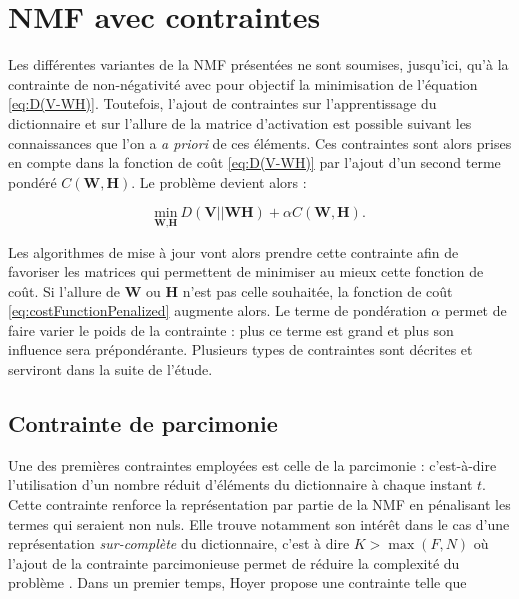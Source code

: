 \section{NMF avec contraintes}\label{part:NMF_contrainte}
Les différentes variantes de la NMF présentées ne sont soumises, jusqu'ici, qu'à la contrainte de non-négativité avec pour objectif la minimisation de l'équation \ref{eq:D(V-WH)}. Toutefois, l'ajout de contraintes sur l'apprentissage du dictionnaire et sur l'allure de la matrice d'activation est possible suivant les connaissances que l'on a \textit{a priori} de ces éléments. Ces contraintes sont alors prises en compte dans la fonction de coût \ref{eq:D(V-WH)} par l'ajout d'un second terme pondéré $C(\mathbf{W},\mathbf{H})$. Le problème devient alors :

\begin{equation}\label{eq:costFunctionPenalized}
\underset{\textbf{W},\textbf{H}}{\text{min}}~D\left(\textbf{V} \vert\vert \textbf{WH}\right) + \alpha C(\mathbf{W},\mathbf{H}).
\end{equation}

Les algorithmes de mise à jour vont alors prendre cette contrainte afin de favoriser les matrices qui permettent de minimiser au mieux cette fonction de coût. Si l'allure de $\mathbf{W}$ ou $\mathbf{H}$ n'est pas celle souhaitée, la fonction de coût \ref{eq:costFunctionPenalized} augmente alors. Le terme de pondération $\alpha$ permet de faire varier le poids de la contrainte : plus ce terme est grand et plus son influence sera prépondérante. Plusieurs types de contraintes sont décrites et serviront dans la suite de l'étude.

\subsection{Contrainte de parcimonie}\label{part:sparsness}
Une des premières contraintes employées est celle de la parcimonie \cite{hoyer_non-negative_2004, le2015sparse} : c'est-à-dire l'utilisation d'un nombre réduit d'éléments du dictionnaire à chaque instant $t$. Cette contrainte renforce la représentation par partie de la NMF en pénalisant les termes qui seraient non nuls. Elle trouve notamment son intérêt dans le cas d'une représentation \textit{sur-complète} du dictionnaire, c'est à dire $K > \max(F,N)$ où l'ajout de la contrainte parcimonieuse permet de réduire la complexité du problème \cite{eggert2004sparse}. Dans un premier temps, Hoyer \cite{hoyer_non-negative_2004} propose une contrainte telle que

